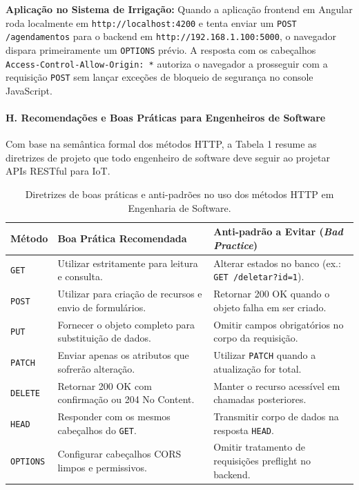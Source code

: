 \textbf{Aplicação no Sistema de Irrigação:} Quando a aplicação frontend em Angular roda localmente em \texttt{http://localhost:4200} e tenta enviar um \texttt{POST /agendamentos} para o backend em \texttt{http://192.168.1.100:5000}, o navegador dispara primeiramente um \texttt{OPTIONS} prévio. A resposta com os cabeçalhos \texttt{Access-Control-Allow-Origin: *} autoriza o navegador a prosseguir com a requisição \texttt{POST} sem lançar exceções de bloqueio de segurança no console JavaScript.

\paragraph*{H. Recomendações e Boas Práticas para Engenheiros de Software}

Com base na semântica formal dos métodos HTTP, a Tabela 1 resume as diretrizes de projeto que todo engenheiro de software deve seguir ao projetar APIs RESTful para IoT.

\begin{table}[h!]
\centering
\fontsize{9}{11}\selectfont
\caption{Diretrizes de boas práticas e anti-padrões no uso dos métodos HTTP em Engenharia de Software.}
\begin{tabular}{|l|p{5cm}|p{5cm}|}
\hline
\textbf{Método} & \textbf{Boa Prática Recomendada} & \textbf{Anti-padrão a Evitar (\textit{Bad Practice})} \\ \hline
\texttt{GET} & Utilizar estritamente para leitura e consulta. & Alterar estados no banco (ex.: \texttt{GET /deletar?id=1}). \\ \hline
\texttt{POST} & Utilizar para criação de recursos e envio de formulários. & Retornar 200 OK quando o objeto falha em ser criado. \\ \hline
\texttt{PUT} & Fornecer o objeto completo para substituição de dados. & Omitir campos obrigatórios no corpo da requisição. \\ \hline
\texttt{PATCH} & Enviar apenas os atributos que sofrerão alteração. & Utilizar \texttt{PATCH} quando a atualização for total. \\ \hline
\texttt{DELETE} & Retornar 200 OK com confirmação ou 204 No Content. & Manter o recurso acessível em chamadas posteriores. \\ \hline
\texttt{HEAD} & Responder com os mesmos cabeçalhos do \texttt{GET}. & Transmitir corpo de dados na resposta \texttt{HEAD}. \\ \hline
\texttt{OPTIONS} & Configurar cabeçalhos CORS limpos e permissivos. & Omitir tratamento de requisições preflight no backend. \\ \hline
\end{tabular}
\end{table}

